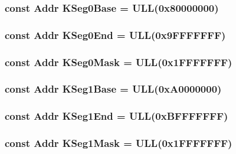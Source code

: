 \label{namespaceMipsISA_a8e9046ea0f091c172954240929973e61}
\hypertarget{namespaceMipsISA_a5c564cd116eed9a5e53455bb05c172dd}{
\subsubsection[{KSeg0Base}]{\setlength{\rightskip}{0pt plus 5cm}const {\bf Addr} {\bf KSeg0Base} = ULL(0x80000000)}}
\label{namespaceMipsISA_a5c564cd116eed9a5e53455bb05c172dd}
\hypertarget{namespaceMipsISA_a38ea65b3cfd9a327455141035c4393ea}{
\subsubsection[{KSeg0End}]{\setlength{\rightskip}{0pt plus 5cm}const {\bf Addr} {\bf KSeg0End} = ULL(0x9FFFFFFF)}}
\label{namespaceMipsISA_a38ea65b3cfd9a327455141035c4393ea}
\hypertarget{namespaceMipsISA_a600dd0a3afcfca38ac64b6e81fe2dec9}{
\subsubsection[{KSeg0Mask}]{\setlength{\rightskip}{0pt plus 5cm}const {\bf Addr} {\bf KSeg0Mask} = ULL(0x1FFFFFFF)}}
\label{namespaceMipsISA_a600dd0a3afcfca38ac64b6e81fe2dec9}
\hypertarget{namespaceMipsISA_a03b2e8fb6bf515015926b3c4251b9c0f}{
\subsubsection[{KSeg1Base}]{\setlength{\rightskip}{0pt plus 5cm}const {\bf Addr} {\bf KSeg1Base} = ULL(0xA0000000)}}
\label{namespaceMipsISA_a03b2e8fb6bf515015926b3c4251b9c0f}
\hypertarget{namespaceMipsISA_a8dea782f9c049005da962641bed6fabe}{
\subsubsection[{KSeg1End}]{\setlength{\rightskip}{0pt plus 5cm}const {\bf Addr} {\bf KSeg1End} = ULL(0xBFFFFFFF)}}
\label{namespaceMipsISA_a8dea782f9c049005da962641bed6fabe}
\hypertarget{namespaceMipsISA_ad90b05c1f6375f46c143d07924601551}{
\subsubsection[{KSeg1Mask}]{\setlength{\rightskip}{0pt plus 5cm}const {\bf Addr} {\bf KSeg1Mask} = ULL(0x1FFFFFFF)}}
